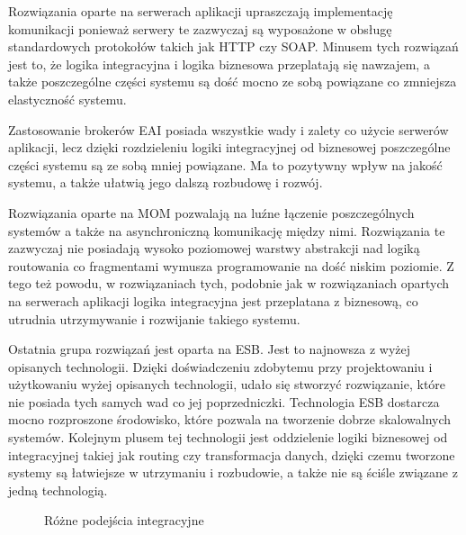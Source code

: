 Rozwiązania oparte na serwerach aplikacji upraszczają implementację komunikacji ponieważ serwery te zazwyczaj są wyposażone w obsługę standardowych protokołów takich jak HTTP czy SOAP. Minusem tych rozwiązań jest to, że logika integracyjna i logika biznesowa przeplatają się nawzajem, a także poszczególne części systemu są dość mocno ze sobą powiązane co zmniejsza elastyczność systemu.

Zastosowanie brokerów EAI posiada wszystkie wady i zalety co użycie serwerów aplikacji, lecz dzięki rozdzieleniu logiki integracyjnej od biznesowej poszczególne części systemu są ze sobą mniej powiązane. Ma to pozytywny wpływ na jakość systemu, a także ułatwią jego dalszą rozbudowę i rozwój.

Rozwiązania oparte na MOM pozwalają na luźne łączenie poszczególnych systemów a także na asynchroniczną komunikację między nimi. Rozwiązania te zazwyczaj nie posiadają wysoko poziomowej warstwy abstrakcji nad logiką routowania co fragmentami wymusza programowanie na dość niskim poziomie. Z tego też powodu, w rozwiązaniach tych, podobnie jak w rozwiązaniach opartych na serwerach aplikacji logika integracyjna jest przeplatana z biznesową, co utrudnia utrzymywanie i rozwijanie takiego systemu.

Ostatnia grupa rozwiązań jest oparta na ESB. Jest to najnowsza z wyżej opisanych technologii. Dzięki doświadczeniu zdobytemu przy projektowaniu i użytkowaniu wyżej opisanych technologii, udało się stworzyć rozwiązanie, które nie posiada tych samych wad co jej poprzedniczki. Technologia ESB dostarcza mocno rozproszone środowisko, które pozwala na tworzenie dobrze skalowalnych systemów. Kolejnym plusem tej technologii jest oddzielenie logiki biznesowej od integracyjnej takiej jak routing czy transformacja danych, dzięki czemu tworzone systemy są łatwiejsze w utrzymaniu i rozbudowie, a także nie są ściśle związane z jedną technologią. 

\setlength\fboxsep{20pt}
\setlength\fboxrule{1pt}
\begin{figure}[!h]
	\centering
	\caption{Różne podejścia integracyjne  \cite{chappell2004}}\label{fig:podejscia_integracyjne}
\end{figure}


